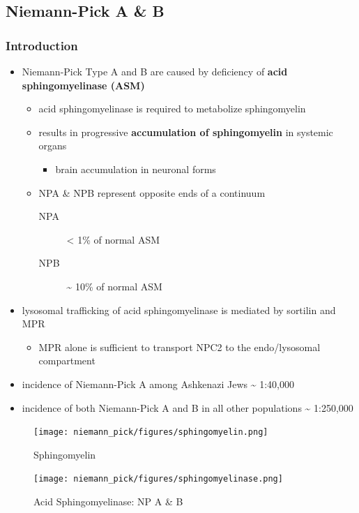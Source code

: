 \documentclass[12pt]{scrartcl}
\begin{document}
\subsection{Niemann-Pick  A \& B}
\label{sec:org6278c15}
\subsubsection{Introduction}
\label{sec:orgd11572e}
\begin{itemize}
\item Niemann-Pick Type A and B are caused by deficiency of \textbf{acid sphingomyelinase (ASM)}
\begin{itemize}
\item acid sphingomyelinase is required to metabolize sphingomyelin
\item results in progressive \textbf{accumulation of sphingomyelin} in systemic organs
\begin{itemize}
\item brain accumulation in neuronal forms
\end{itemize}
\item NPA \& NPB represent opposite ends of a continuum
\begin{description}
\item[{NPA}] \textless{} 1\% of normal ASM
\item[{NPB}] \textasciitilde{} 10\% of normal ASM
\end{description}
\end{itemize}
\item lysosomal trafficking of acid sphingomyelinase is mediated by
sortilin and MPR
\begin{itemize}
\item MPR alone is sufficient to transport NPC2 to the endo/lysosomal compartment
\end{itemize}
\item incidence of Niemann-Pick A among Ashkenazi Jews \textasciitilde{} 1:40,000
\item incidence of both Niemann-Pick A and B in all other populations \textasciitilde{} 1:250,000
\end{itemize}

\begin{figure}[htbp]
\centering
\texttt{[image: niemann\_pick/figures/sphingomyelin.png]}
\caption{\label{fig:orgb46f53a}Sphingomyelin}
\end{figure}

\begin{figure}[htbp]
\centering
\texttt{[image: niemann\_pick/figures/sphingomyelinase.png]}
\caption{\label{fig:org1bb5576}Acid Sphingomyelinase: NP A \& B}
\end{figure}
\end{document}
